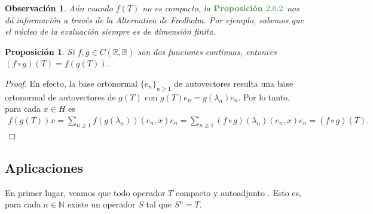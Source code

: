 \documentclass[11pt]{report}
\theoremstyle{colored}
\newtheorem{proposition}{Proposición}[section]
\newtheorem{remark}{Observación}[section]
\newcommand{\N}{\mathbb{N}}
\newcommand{\R}{\mathbb{R}}
\newcommand{\paint}[1]{\color{color}{#1}}
\newcommand{\tpaint}[1]{\paint{\textbf{#1}}}
\begin{document}
\begin{remark} Aún cuando $f(T)$ no es compacto, la $\tpaint{Proposición }2.0.2$ nos dá información a través de la Alternativa de Fredholm. Por ejemplo, sabemos que el núcleo de la evaluación siempre es de dimensión finita.
\end{remark}

\begin{proposition} Si $f,g \in C(\R,\R)$ son dos funciones continuas, entonces $(f \circ g)(T) = f(g(T))$.
\end{proposition}
\begin{proof} En efecto, la base ortonormal $\{e_n\}_{n \geq 1}$ de autovectores resulta una base ortonormal de autovectores de $g(T)$ con $g(T)e_n = g(\lambda_n)e_n$. Por lo tanto, para cada $x \in H$ es
\begin{align*}
f(g(T))x = \sum_{n \geq 1}f(g(\lambda_n))(e_n,x)e_n = \sum_{n \geq 1}(f \circ g)(\lambda_n)(e_n,x)e_n = (f \circ g)(T).
\end{align*}
\end{proof}

\subsection{Aplicaciones}

En primer lugar, veamos que todo operador $T$ compacto y autoadjunto . Esto es, para cada $n \in \N$ existe un operador $S$ tal que $S^n = T$.
\end{document}
